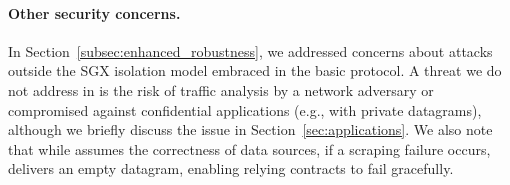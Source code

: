 \paragraph{Other security concerns.} In Section~\ref{subsec:enhanced_robustness}, we addressed concerns about attacks outside the SGX isolation model embraced in the basic \tc protocol. A threat we do not address in \tc is the risk of traffic analysis by a network adversary or compromised \medname against confidential applications (e.g., with private datagrams), although we briefly discuss the issue in Section~\ref{sec:applications}. We also note that while \tc assumes the correctness of data sources, if a scraping failure occurs, \tc delivers an empty datagram, enabling relying contracts to fail gracefully.
